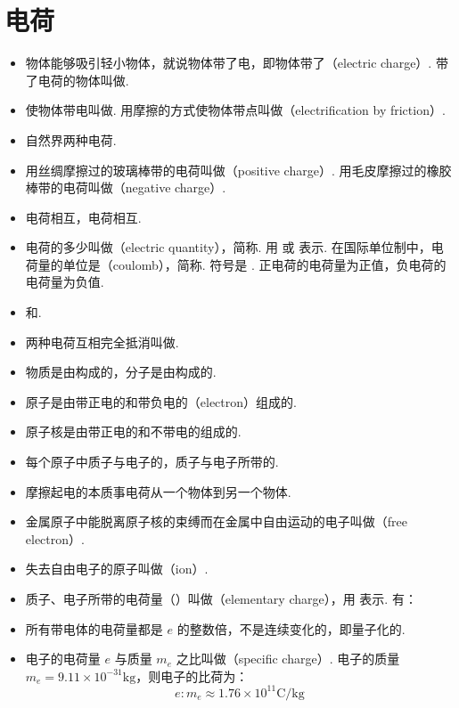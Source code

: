 \newpage
\section{电荷}

\vspace{10pt}
\begin{itemize}
\item 物体能够吸引轻小物体，就说物体带了电，即物体带了（electric charge）. 带了电荷的物体叫做.
\item 使物体带电叫做. 用摩擦的方式使物体带点叫做（electrification by friction）.
\item 自然界两种电荷.
\item 用丝绸摩擦过的玻璃棒带的电荷叫做（positive charge）. 用毛皮摩擦过的橡胶棒带的电荷叫做（negative charge）.
\item {}电荷相互，电荷相互.
\item 电荷的多少叫做（electric quantity），简称. 用  或  表示. 在国际单位制中，电荷量的单位是（coulomb），简称. 符号是 . 正电荷的电荷量为正值，负电荷的电荷量为负值.
\item {}和.
\item 两种电荷互相完全抵消叫做.
\item 物质是由构成的，分子是由构成的.
\item 原子是由带正电的和带负电的（electron）组成的.
\item 原子核是由带正电的和不带电的组成的.
\item 每个原子中质子与电子的，质子与电子所带的.
\item 摩擦起电的本质事电荷从一个物体到另一个物体.
\item 金属原子中能脱离原子核的束缚而在金属中自由运动的电子叫做（free electron）.
\item 失去自由电子的原子叫做（ion）.
\item 质子、电子所带的电荷量（）叫做（elementary charge），用  表示. 有：
\item 所有带电体的电荷量都是 $e$ 的整数倍，不是连续变化的，即量子化的.
\item 电子的电荷量 $e$ 与质量 $m_e$ 之比叫做（specific charge）. 电子的质量 $m_e=9.11\times10^{-31}\text{kg}$，则电子的比荷为：
$$
e:m_e\approx1.76\times10^{11}\text{C}/\text{kg}
$$
\end{itemize}